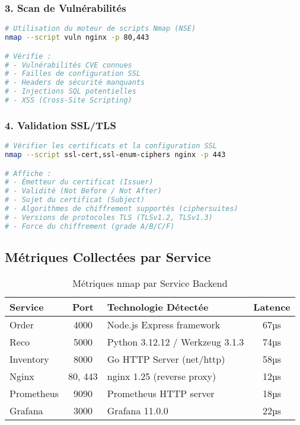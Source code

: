 \documentclass[11pt,a4paper]{report}
\begin{document}
\subsubsection{3. Scan de Vulnérabilités}

\begin{lstlisting}[language=bash, caption=Scan de Vulnérabilités avec Scripts NSE]
# Utilisation du moteur de scripts Nmap (NSE)
nmap --script vuln nginx -p 80,443

# Vérifie :
# - Vulnérabilités CVE connues
# - Failles de configuration SSL
# - Headers de sécurité manquants
# - Injections SQL potentielles
# - XSS (Cross-Site Scripting)
\end{lstlisting}

\subsubsection{4. Validation SSL/TLS}

\begin{lstlisting}[language=bash, caption=Analyse des Certificats SSL]
# Vérifier les certificats et la configuration SSL
nmap --script ssl-cert,ssl-enum-ciphers nginx -p 443

# Affiche :
# - Émetteur du certificat (Issuer)
# - Validité (Not Before / Not After)
# - Sujet du certificat (Subject)
# - Algorithmes de chiffrement supportés (ciphersuites)
# - Versions de protocoles TLS (TLSv1.2, TLSv1.3)
# - Force du chiffrement (grade A/B/C/F)
\end{lstlisting}

\subsection{Métriques Collectées par Service}

\begin{table}[H]
\centering
\caption{Métriques nmap par Service Backend}
\label{tab:nmap_metrics}
\begin{tabular}{|l|c|l|c|}
\hline
\textbf{Service} & \textbf{Port} & \textbf{Technologie Détectée} & \textbf{Latence} \\
\hline
Order & 4000 & Node.js Express framework & 67µs \\
\hline
Reco & 5000 & Python 3.12.12 / Werkzeug 3.1.3 & 74µs \\
\hline
Inventory & 8000 & Go HTTP Server (net/http) & 58µs \\
\hline
Nginx & 80, 443 & nginx 1.25 (reverse proxy) & 12µs \\
\hline
Prometheus & 9090 & Prometheus HTTP server & 18µs \\
\hline
Grafana & 3000 & Grafana 11.0.0 & 22µs \\
\hline
\end{tabular}
\end{table}
\end{document}
